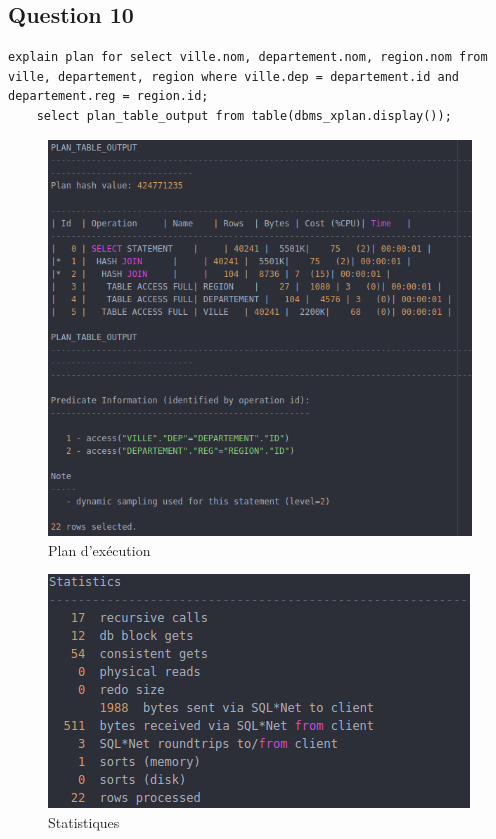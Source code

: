 \documentclass[a4paper,12pt]{article}
\begin{document}
\newpage

\subsection{Question 10}
\begin{minipage}{\linewidth}
  \begin{lstlisting}[caption={requêtes permettant d'expliquer le plan d'exécution affichant le nom des villes, de leurs départements et de leurs régions}, label={lst:question_10}]
    explain plan for select ville.nom, departement.nom, region.nom from ville, departement, region where ville.dep = departement.id and departement.reg = region.id;
    select plan_table_output from table(dbms_xplan.display());
  \end{lstlisting}
\end{minipage}

\begin{figure}[!ht]
  \centering
  \includegraphics[scale=0.6]{images/q10_1.png}
  \caption{Plan d'exécution}
\end{figure}

\begin{figure}[!ht]
  \centering
  \includegraphics[scale=0.6]{images/q10_2.png}
  \caption{Statistiques}
\end{figure}
\end{document}
